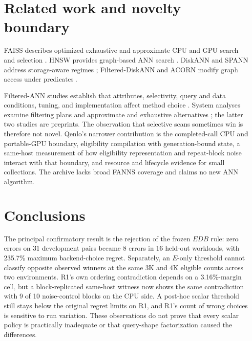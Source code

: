 \documentclass[10pt]{article}
\begin{document}
\section{Related work and novelty boundary}
FAISS describes optimized exhaustive and approximate CPU and GPU search and selection \citep{johnson2019billion,douze2024faiss}. HNSW provides graph-based ANN search \citep{malkov2020hnsw}. DiskANN and SPANN address storage-aware regimes \citep{subramanya2019diskann,chen2021spann}; Filtered-DiskANN and ACORN modify graph access under predicates \citep{gollapudi2023filtered,patel2024acorn}.

Filtered-ANN studies establish that attributes, selectivity, query and data conditions, tuning, and implementation affect method choice \citep{iff2026fanns,li2025attribute,shi2025unified}. System analyses examine filtering plans and approximate and exhaustive alternatives \citep{amanbayev2026systems}; the latter two studies are preprints. The observation that selective scans sometimes win is therefore not novel. Qenlo's narrower contribution is the completed-call CPU and portable-GPU boundary, eligibility compilation with generation-bound state, a same-host measurement of how eligibility representation and repeat-block noise interact with that boundary, and resource and lifecycle evidence for small collections. The archive lacks broad FANNS coverage and claims no new ANN algorithm.

\section{Conclusions}
The principal confirmatory result is the rejection of the frozen $EDB$ rule: zero errors on 31 development pairs became 8 errors in 16 held-out workloads, with 235.7\% maximum backend-choice regret. Separately, an $E$-only threshold cannot classify opposite observed winners at the same 3K and 4K eligible counts across two environments. R1's own ordering contradiction depends on a 3.16\%-margin cell, but a block-replicated same-host witness now shows the same contradiction with 9 of 10 noise-control blocks on the CPU side. A post-hoc scalar threshold still stays below the original regret limits on R1, and R1's count of wrong choices is sensitive to run variation. These observations do not prove that every scalar policy is practically inadequate or that query-shape factorization caused the differences.
\end{document}
